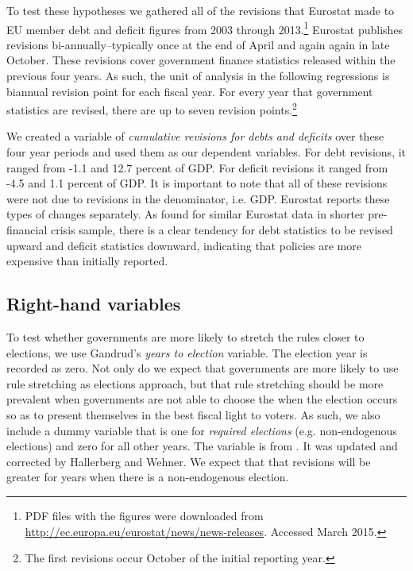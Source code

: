 \documentclass[]{article}
\begin{document}
To test these hypotheses we gathered all of the revisions that Eurostat made to EU member debt and deficit figures from 2003 through 2013.\footnote{PDF files with the figures were downloaded from \url{http://ec.europa.eu/eurostat/news/news-releases}. Accessed March 2015.} Eurostat publishes revisions bi-annually--typically once at the end of April and again again in late October. These revisions cover government finance statistics released within the previous four years. As such, the unit of analysis in the following regressions is biannual revision point for each fiscal year. For every year that government statistics are revised, there are up to seven revision points.\footnote{The first revisions occur October of the initial reporting year.}

We created a variable of \emph{cumulative revisions for debts and deficits} over these four year periods and used them as our dependent variables. For debt revisions, it ranged from -1.1 and 12.7 percent of GDP. For deficit revisions it ranged from -4.5 and 1.1 percent of GDP. It is important to note that all of these revisions were not due to revisions in the denominator, i.e. GDP. Eurostat reports these types of changes separately. As \cite{DeCastro2013} found for similar Eurostat data in shorter pre-financial crisis sample, there is a clear tendency for debt statistics to be revised upward and deficit statistics downward, indicating that policies are more expensive than initially reported.

\subsection{Right-hand variables}

To test whether governments are more likely to stretch the rules closer to elections, we use Gandrud's \citeyearpar{gandrudYrcurnt} \emph{years to election} variable. The election year is recorded as zero. Not only do we expect that governments are more likely to use rule stretching as elections approach, but that rule stretching should be more prevalent when governments are not able to choose the when the election occurs so as to present themselves in the best fiscal light to voters. As such, we also include a dummy variable that is one for \emph{required elections} (e.g. non-endogenous elections) and zero for all other years. The variable is from \cite{Brender2008}. It was updated and corrected by Hallerberg and Wehner. We expect that that revisions will be greater for years when there is a non-endogenous election.
\end{document}
